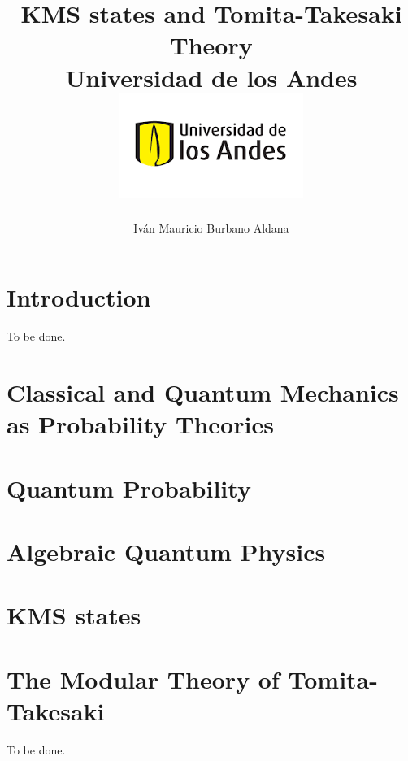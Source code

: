 \documentclass[12pt]{report}
\title 
{
	{KMS states and Tomita-Takesaki Theory}\\
	{\large Universidad de los Andes}\\
	{\includegraphics{logo.png}}	
}
\author{Iván Mauricio Burbano Aldana}
\theoremstyle{definition}
\begin{document}
\maketitle

\tableofcontents

\chapter{Introduction}
To be done.

\chapter{Classical and Quantum Mechanics as Probability Theories}


\chapter{Quantum Probability}


\chapter{Algebraic Quantum Physics}


\chapter{KMS states}


\chapter{The Modular Theory of Tomita-Takesaki}
To be done.



\end{document}
